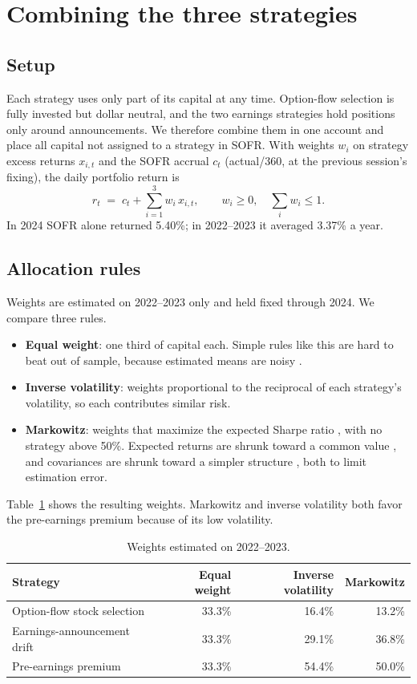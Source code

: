 \documentclass[main.tex]{subfiles}
\begin{document}
\section{Combining the three strategies}\label{sec:portfolio}

\subsection{Setup}
Each strategy uses only part of its capital at any time. Option-flow selection is fully invested but dollar neutral, and the two earnings strategies hold positions only around announcements. We therefore combine them in one account and place all capital not assigned to a strategy in SOFR. With weights $w_i$ on strategy excess returns $x_{i,t}$ and the SOFR accrual $c_t$ (actual/360, at the previous session's fixing), the daily portfolio return is
\begin{equation}
  r_t \;=\; c_t + \sum_{i=1}^{3} w_i\, x_{i,t}, \qquad w_i \ge 0,\quad \sum_i w_i \le 1 .
\end{equation}
In 2024 SOFR alone returned 5.40\%; in 2022--2023 it averaged 3.37\% a year.

\subsection{Allocation rules}
Weights are estimated on 2022--2023 only and held fixed through 2024. We compare three rules.
\begin{itemize}
  \item \textbf{Equal weight}: one third of capital each. Simple rules like this are hard to beat out of sample, because estimated means are noisy \citep{demiguel2009}.
  \item \textbf{Inverse volatility}: weights proportional to the reciprocal of each strategy's volatility, so each contributes similar risk.
  \item \textbf{Markowitz}: weights that maximize the expected Sharpe ratio \citep{markowitz1952}, with no strategy above 50\%. Expected returns are shrunk toward a common value \citep{jorion1986}, and covariances are shrunk toward a simpler structure \citep{ledoit2004}, both to limit estimation error.
\end{itemize}
Table~\ref{tab:weights} shows the resulting weights. Markowitz and inverse volatility both favor the pre-earnings premium because of its low volatility.

\begin{table}[ht]\centering\small
\caption{Weights estimated on 2022--2023.}\label{tab:weights}
\begin{tabular}{lrrr}
\toprule
Strategy & Equal weight & Inverse volatility & Markowitz \\
\midrule
Option-flow stock selection & 33.3\% & 16.4\% & 13.2\% \\
Earnings-announcement drift & 33.3\% & 29.1\% & 36.8\% \\
Pre-earnings premium & 33.3\% & 54.4\% & 50.0\% \\
\bottomrule
\end{tabular}
\end{table}
\end{document}
